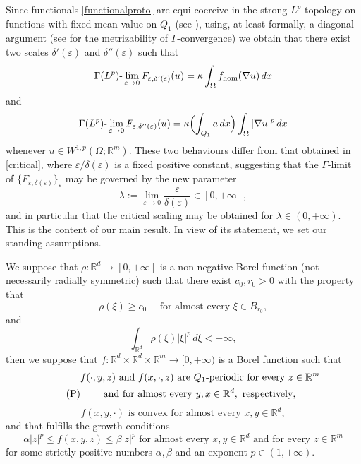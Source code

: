 \documentclass{article}
\theoremstyle{definition}
\newcommand{\e}{\varepsilon}
\newcommand{\R}{\mathbb{R}}
\begin{document}
Since functionals \eqref{functionalproto} are equi-coercive in the strong $L^p$-topology on functions with fixed mean value on $Q_1$ (see \cite[Theorems 1.1, 1.2]{P2}), using, at least formally, a diagonal argument (see \cite{DM} for the metrizability of $\Gamma$-convergence) we obtain that there exist two scales $\delta'(\e)$ and $\delta''(\e)$ such that 
\begin{equation*}
    \Gamma(L^p)\text{-}\lim_{\e\to0} F_{\e,\delta'(\e)}(u)=  \kappa \int_\Omega f_{\rm hom}(\nabla u)\, dx
\end{equation*}
and
\begin{equation*}
    \Gamma(L^p)\text{-}\lim_{\e\to0} F_{\e,\delta''(\e)}(u)=  \kappa \Bigl(\int_{Q_1}a\,dx\Bigr)\int_\Omega |\nabla u|^p\, dx
\end{equation*}
whenever $u\in W^{1,p}(\Omega; \R^m)$. These two behaviours differ from that obtained in \eqref{critical}, where $\e/\delta(\e)$ is a fixed positive constant, suggesting that the $\Gamma$-limit of $\{F_{\e,\delta(\e)}\}_\e$ may be governed by the new parameter
\begin{equation*}
\lambda:=\lim_{\e\to0}\frac{\e}{\delta(\e)}\in[0,+\infty],
\end{equation*}
and in particular that the critical scaling may be obtained for $\lambda\in(0,+\infty)$. This is the content of our main result. In view of its statement, we set our standing assumptions. 

\smallskip

We suppose that $\rho:\R^d\to [0,+\infty]$ is a non-negative Borel function (not necessarily radially symmetric) such that there exist $c_0,r_0>0$ with the property that 
\begin{equation}\label{rho : ball}
\tag{$\rho_1$}
    \rho(\xi)\geq c_0 \quad \text{ for almost every } \xi\in B_{r_0},
\end{equation}
and 
\begin{equation}\label{rho : moment}
\tag{$\rho_2$}
    \int_{\R^d}\rho(\xi)|\xi|^p\, d\xi <+\infty,
\end{equation}
then we suppose that $f: \R^d\times \R^d\times \R^m\to[0,+\infty)$ is a Borel function such that 
\begin{align}  \notag
& f(\cdot,y,z) \text{ and } f(x,\cdot,z)  \text{ are } Q_1\text{-periodic for every } z\in \R^m \\ \label{f : period} \tag{P}
& \qquad\text{ and for almost every } y, x\in\R^d, \text{ respectively},
\end{align}
\begin{equation} \label{f : convex}
    \tag{C}
f(x,y,\cdot) \text{ is convex for almost every } x,y\in \R^d,
\end{equation}
and that fulfills the growth conditions 
\begin{equation} \label{f : growth}
    \tag{GC}
\alpha|z|^p\leq f(x,y,z)\leq \beta|z|^p \text{ for almost every } x,y\in \R^d \text{ and for every } z\in \R^m
\end{equation}
for some strictly positive numbers $\alpha,\beta$ and an exponent $p\in(1,+\infty)$. 
\end{document}
